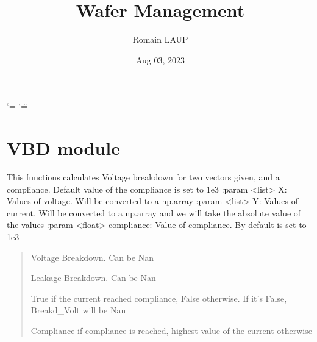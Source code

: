 \documentclass[letterpaper,10pt,english]{sphinxmanual}
\title{Wafer Management}
\date{Aug 03, 2023}
\author{Romain LAUP}
\begin{document}
\ifdefined\shorthandoff
  \ifnum\catcode`\=\string=\active\shorthandoff{=}\fi
  \ifnum\catcode`\"=\active{}\fi
\fi

\pagestyle{empty}
\sphinxmaketitle
\pagestyle{plain}
\sphinxtableofcontents
\pagestyle{normal}
\label{\detokenize{index::doc}}


\sphinxstepscope


\chapter{VBD module}
\label{\detokenize{VBD:module-VBD}}\label{\detokenize{VBD:vbd-module}}\label{\detokenize{VBD::doc}}

\begin{fulllineitems}
\label{\detokenize{VBD:VBD.calculate_breakdown}}
\pysigstartsignatures
{}
\pysigstopsignatures
\sphinxAtStartPar
This functions calculates Voltage breakdown for two vectors given, and a compliance. Default value of the compliance is set to 1e\sphinxhyphen{}3
:param \textless{}list\textgreater{} X: Values of voltage. Will be converted to a np.array
:param \textless{}list\textgreater{} Y: Values of current. Will be converted to a np.array and we will take the absolute value of the values
:param \textless{}float\textgreater{} compliance: Value of compliance. By default is set to 1e\sphinxhyphen{}3
\begin{quote}\begin{description}
\sphinxAtStartPar
Voltage Breakdown. Can be Nan

\sphinxAtStartPar
Leakage Breakdown. Can be Nan

\sphinxAtStartPar
True if the current reached compliance, False otherwise. If it’s False, Breakd\_Volt will be Nan

\sphinxAtStartPar
Compliance if compliance is reached, highest value of the current otherwise

\end{description}\end{quote}

\end{fulllineitems}
\end{document}
